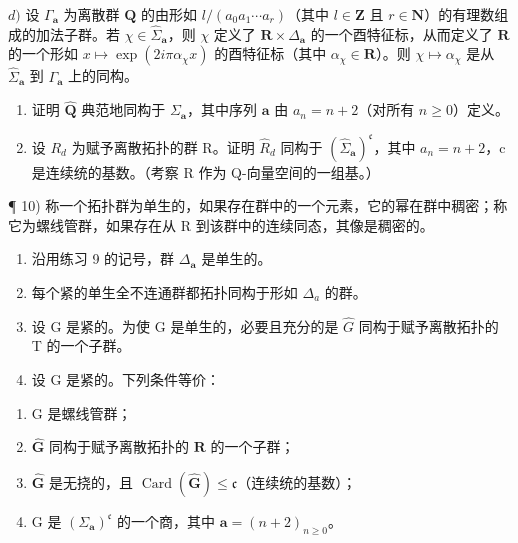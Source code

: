 \(d)\) 设 \(\Gamma_{\boldsymbol{a}}\) 为离散群 \(\mathbf{Q}\) 的由形如 \(l/(a_{0}a_{1}\cdots a_{r})\)（其中 \(l\in\mathbf{Z}\) 且 \(r\in\mathbf{N}\)）的有理数组成的加法子群。若 \(\chi\in\widehat{\Sigma}_{\boldsymbol{a}}\)，则 \(\chi\) 定义了 \(\mathbf{R}\times\Delta_{\boldsymbol{a}}\) 的一个酉特征标，从而定义了 \(\mathbf{R}\) 的一个形如 \(x\mapsto\exp(2i\pi\alpha_{\chi}x)\) 的酉特征标（其中 \(\alpha_{\chi}\in\mathbf{R}\)）。则 \(\chi\mapsto\alpha_{\chi}\) 是从 \(\widehat{\Sigma}_{\boldsymbol{a}}\) 到 \(\Gamma_{\boldsymbol{a}}\) 上的同构。

\begin{enumerate}
\def\labelenumi{\alph{enumi})}
\setcounter{enumi}{4}
\item
  证明 \(\widehat{\mathbf{Q}}\) 典范地同构于 \(\Sigma_{\pmb{a}}\)，其中序列 \(\pmb{a}\) 由 \(a_{n} = n + 2\)（对所有 \(n \geqslant 0\)）定义。
\item
  设 \(R_{d}\) 为赋予离散拓扑的群 R。证明 \(\widehat{R}_{d}\) 同构于 \((\widehat{\Sigma}_{\boldsymbol{a}})^{\mathfrak{c}}\)，其中 \(a_{n}=n+2\)，c 是连续统的基数。（考察 R 作为 Q-向量空间的一组基。）
\end{enumerate}

¶ 10) 称一个拓扑群为单生的，如果存在群中的一个元素，它的幂在群中稠密；称它为螺线管群，如果存在从 R 到该群中的连续同态，其像是稠密的。

\begin{enumerate}
\def\labelenumi{\alph{enumi})}
\item
  沿用练习 9 的记号，群 \(\Delta_{\pmb{a}}\) 是单生的。
\item
  每个紧的单生全不连通群都拓扑同构于形如 \(\Delta_{a}\) 的群。
\item
  设 G 是紧的。为使 G 是单生的，必要且充分的是 \(\widehat{G}\) 同构于赋予离散拓扑的 T 的一个子群。
\item
  设 G 是紧的。下列条件等价：
\end{enumerate}

\begin{enumerate}
\def\labelenumi{(\roman{enumi})}
\item
  G 是螺线管群；
\item
  \(\widehat{\mathbf{G}}\) 同构于赋予离散拓扑的 \(\mathbf{R}\) 的一个子群；
\item
  \(\widehat{\mathbf{G}}\) 是无挠的，且 \(\operatorname{Card}(\widehat{\mathbf{G}}) \leqslant \mathfrak{c}\)（连续统的基数）；
\item
  G 是 \((\Sigma_{\boldsymbol{a}})^{\mathfrak{c}}\) 的一个商，其中 \(\boldsymbol{a}=(n+2)_{n\geqslant0}\)。
\end{enumerate}


